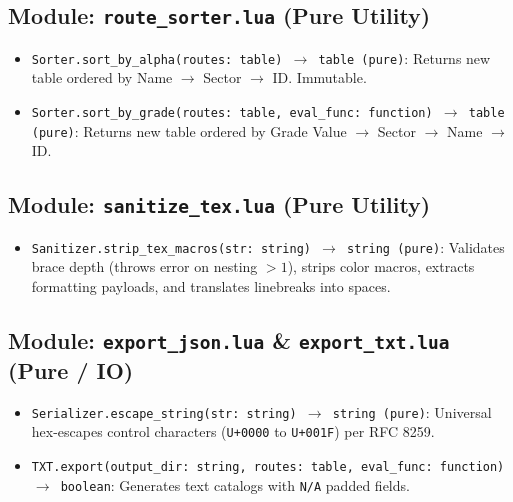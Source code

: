 \subsection{Module: \texttt{route\_sorter.lua} (Pure Utility)}
{\small
\begin{itemize}
    \item \texttt{Sorter.sort\_by\_alpha(routes: table) $\to$ table (pure)}: Returns new table ordered by Name $\to$ Sector $\to$ ID. Immutable.
    \item \texttt{Sorter.sort\_by\_grade(routes: table, eval\_func: function) $\to$ table (pure)}: Returns new table ordered by Grade Value $\to$ Sector $\to$ Name $\to$ ID.
\end{itemize}
}

\subsection{Module: \texttt{sanitize\_tex.lua} (Pure Utility)}
{\small
\begin{itemize}
    \item \texttt{Sanitizer.strip\_tex\_macros(str: string) $\to$ string (pure)}: Validates brace depth (throws error on nesting $>1$), strips color macros, extracts formatting payloads, and translates linebreaks into spaces.
\end{itemize}
}

\subsection{Module: \texttt{export\_json.lua} \& \texttt{export\_txt.lua} (Pure / IO)}
{\small
\begin{itemize}
    \item \texttt{Serializer.escape\_string(str: string) $\to$ string (pure)}: Universal hex-escapes control characters (\texttt{U+0000} to \texttt{U+001F}) per RFC 8259.
    \item \texttt{TXT.export(output\_dir: string, routes: table, eval\_func: function) $\to$ boolean}: Generates text catalogs with \texttt{N/A} padded fields.
\end{itemize}
}
